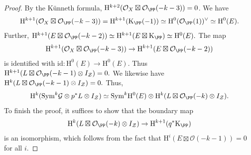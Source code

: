\begin{proof}
By the K\"unneth formula, $\mathrm{H}^{k+2}(\mathcal{O}_X \boxtimes \mathcal{O}_{\PP}(-k-3))=0$. We have
$$\mathrm{H}^{k+1}(\mathcal{O}_X \boxtimes \mathcal{O}_{\PP}(-k-3))=\mathrm{H}^{k+1}(\mathrm{K}_{\PP}(-1)) \simeq \mathrm{H}^0(\mathcal{O}_{\PP}(1))^{\vee}\simeq \mathrm{H}^0(E).$$
Further, $\mathrm{H}^{k+1}(E \boxtimes \mathcal{O}_{\PP}(-k-2)) \simeq \mathrm{H}^{k+1}(E \boxtimes \mathrm{K}_{\PP}) \simeq \mathrm{H}^0(E).$
The map $$\mathrm{H}^{k+1}(\mathcal{O}_X \boxtimes \mathcal{O}_{\PP}(-k-3)) \to \mathrm{H}^{k+1}(E \boxtimes \mathcal{O}_{\PP}(-k-2)) $$ is identified with $\mathrm{id}: \mathrm{H}^0(E) \to \mathrm{H}^0(E)$. Thus $\mathrm{H}^{k+1}(L \boxtimes \mathcal{O}_{\PP}(-k-1)\otimes I_{\mathcal{Z}})=0.$ We likewise have $\mathrm{H}^{k}(L \boxtimes \mathcal{O}_{\PP}(-k-1)\otimes I_{\mathcal{Z}})=0.$
Thus,
\begin{align*}
\mathrm{H}^k(\mathrm{Sym}^{k} \mathcal{G} \otimes p^*L \otimes I_{\mathcal{Z}}) %
\simeq \mathrm{Sym}^k\mathrm{H}^0(E)\otimes \mathrm{H}^k(L \boxtimes \mathcal{O}_{\PP}(-k)\otimes I_{\mathcal{Z}}).
\end{align*}
To finish the proof, it suffices to show that the boundary map
$$\mathrm{H}^k(L \boxtimes \mathcal{O}_{\PP}(-k)\otimes I_{\mathcal{Z}}) \to \mathrm{H}^{k+1}(q^*\mathrm{K}_{\PP})$$
is an isomorphism, which follows from the fact that $\mathrm{H}^i(E \boxtimes \mathcal{O}(-k-1))=0$ for all $i$.
\end{proof}


